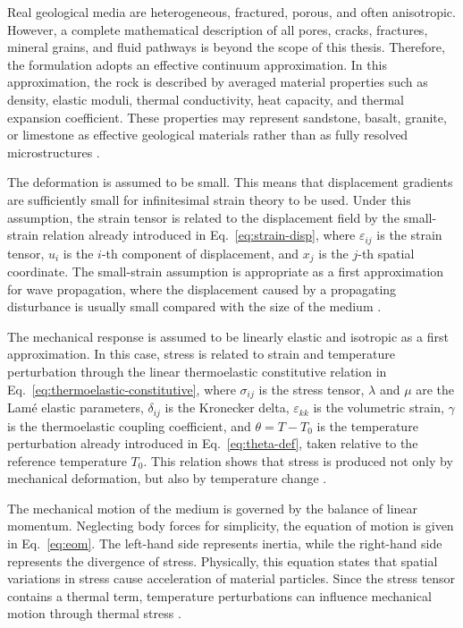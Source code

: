 Real geological media are heterogeneous, fractured, porous, and often anisotropic. However, a complete mathematical description of all pores, cracks, fractures, mineral grains, and fluid pathways is beyond the scope of this thesis. Therefore, the formulation adopts an effective continuum approximation. In this approximation, the rock is described by averaged material properties such as density, elastic moduli, thermal conductivity, heat capacity, and thermal expansion coefficient. These properties may represent sandstone, basalt, granite, or limestone as effective geological materials rather than as fully resolved microstructures \cite{jaeger2007,mavko2009}.

The deformation is assumed to be small. This means that displacement gradients are sufficiently small for infinitesimal strain theory to be used. Under this assumption, the strain tensor is related to the displacement field by the small-strain relation already introduced in Eq.~\eqref{eq:strain-disp},
where \(\varepsilon_{ij}\) is the strain tensor, \(u_i\) is the \(i\)-th component of displacement, and \(x_j\) is the \(j\)-th spatial coordinate. The small-strain assumption is appropriate as a first approximation for wave propagation, where the displacement caused by a propagating disturbance is usually small compared with the size of the medium \cite{aki2002,jaeger2007}.

The mechanical response is assumed to be linearly elastic and isotropic as a first approximation. In this case, stress is related to strain and temperature perturbation through the linear thermoelastic constitutive relation in Eq.~\eqref{eq:thermoelastic-constitutive}, where \(\sigma_{ij}\) is the stress tensor, \(\lambda\) and \(\mu\) are the Lamé elastic parameters, \(\delta_{ij}\) is the Kronecker delta, \(\varepsilon_{kk}\) is the volumetric strain, \(\gamma\) is the thermoelastic coupling coefficient, and $\theta = T - T_0$ is the temperature perturbation already introduced in Eq.~\eqref{eq:theta-def}, taken relative to the reference temperature \(T_0\). This relation shows that stress is produced not only by mechanical deformation, but also by temperature change \cite{nowacki1986,boley1960}.

The mechanical motion of the medium is governed by the balance of linear momentum. Neglecting body forces for simplicity, the equation of motion is given in Eq.~\eqref{eq:eom}. The left-hand side represents inertia, while the right-hand side represents the divergence of stress. Physically, this equation states that spatial variations in stress cause acceleration of material particles. Since the stress tensor contains a thermal term, temperature perturbations can influence mechanical motion through thermal stress \cite{aki2002,nowacki1986}.

